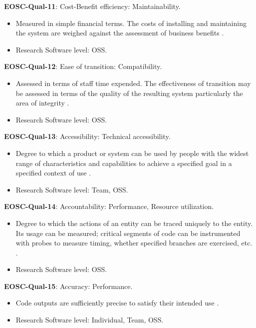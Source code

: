 \textbf{EOSC-Qual-11}: Cost-Benefit efficiency: Maintainability.

\begin{itemize}
    \item Measured in simple financial terms. The costs of installing and maintaining the system are weighed against the assessment of business benefits \cite{gillies_modelling_1992}.
    \item Research Software level: OSS.
\end{itemize}

\textbf{EOSC-Qual-12}: Ease of transition: Compatibility.

\begin{itemize}
    \item Assessed in terms of staff time expended. The effectiveness of transition may be assessed in terms of the quality of the resulting system particularly the area of integrity \cite{iso_25010_2011_2017,gillies_modelling_1992}.
    \item Research Software level: OSS.
\end{itemize}

\textbf{EOSC-Qual-13}: Accessibility: Technical accessibility.

\begin{itemize}
    \item Degree to which a product or system can be used by people with the widest range of characteristics and capabilities to achieve a specified goal in a specified context of use \cite{iso_25010_2011_2017,boehm_quantitative_1976}.
    \item Research Software level: Team, OSS.
\end{itemize}

\textbf{EOSC-Qual-14}: Accountability: Performance, Resource utilization.

\begin{itemize}
    \item Degree to which the actions of an entity can be traced uniquely to the entity. Its usage can be measured; critical segments of code can be instrumented with probes to measure timing, whether specified branches are exercised, etc. \cite{iso_25010_2011_2017,boehm_quantitative_1976}.
    \item Research Software level: OSS.
\end{itemize}

\textbf{EOSC-Qual-15}: Accuracy: Performance.

\begin{itemize}
    \item Code outputs are sufficiently precise to satisfy their intended use \cite{boehm_quantitative_1976}.
    \item Research Software level: Individual, Team, OSS.
\end{itemize}

